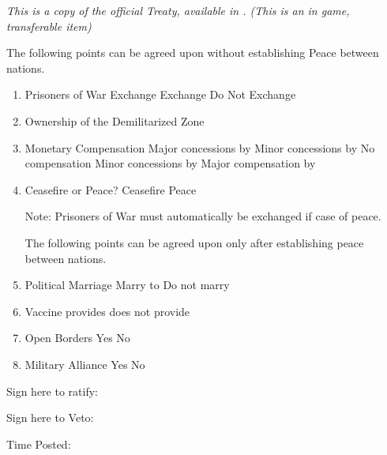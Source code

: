 \documentclass[white]{NeptuneBall}
\begin{document}
\name{\wTreaty{}}

\emph{This is a copy of the official Treaty, available in \pBanquet{}. (This is an in game, transferable item)}

The following points can be agreed upon without establishing Peace between nations.

\begin{enumerate}
\item Prisoners of War Exchange            Exchange            Do Not Exchange
\item Ownership of the \pGazaStrip{}             \pAtlantis{}             \pPacifica{}            Demilitarized Zone
\item Monetary Compensation      Major concessions by \pAtlantis{}    Minor concessions by \pAtlantis{}      No compensation     Minor concessions by \pPacifica{}       Major compensation by \pPacifica{}
\item Ceasefire or Peace?               Ceasefire                Peace

Note: Prisoners of War must automatically be exchanged if case of peace.



The following points can be agreed upon only after establishing peace between nations.

\item Political Marriage              Marry \cPrince{} to \cPrincess{}           Do not marry
\item \cPolio{} Vaccine               \pAtlantis{} provides             \pAtlantis{} does not provide
\item Open Borders                     Yes                              No
\item Military Alliance                    Yes                        No

\end{enumerate}

Sign here to ratify:




Sign here to Veto:




Time Posted:
\end{document}
